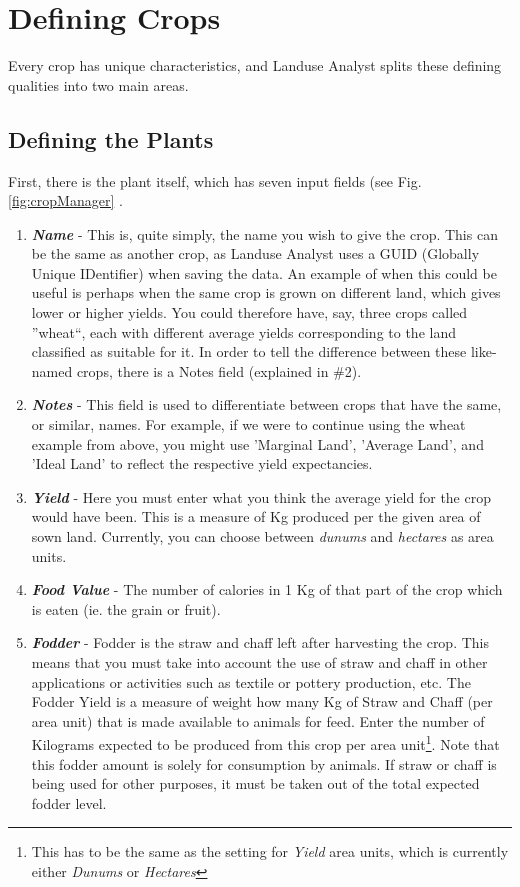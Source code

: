 \section{Defining Crops}Every crop has unique
characteristics, and Landuse Analyst splits these defining qualities into two
main areas.
  \subsection{Defining the Plants}First, there is
the plant itself, which has seven input fields (see Fig. \ref{fig:cropManager} .
    \begin{enumerate}
      \item \textbf{\textit{Name}} - This is, quite simply, the name you wish to
give the crop.  This can be the same as another crop, as Landuse Analyst uses a
GUID (Globally Unique IDentifier) when saving the data.  An example of when this
could be useful is perhaps when the same crop is grown on different land, which
gives lower or higher yields.  You could therefore have, say, three crops called
''wheat``, each with different average yields corresponding to the land
classified as suitable for it.  In order to tell the difference between these
like-named crops, there is a Notes field (explained in \#2).

      \item \textbf{\textit{Notes}} - This field is used to differentiate
between crops that have the same, or similar, names.  For example, if we were to
continue using the wheat example from above, you might use 'Marginal Land',
'Average Land', and 'Ideal Land' to reflect the respective yield expectancies.

      \item \textbf{\textit{Yield}} - Here you must enter what you think the
average yield for the crop would have been. This is a measure of Kg produced per
the given area of sown land.  Currently, you can choose between \textit{dunums}
and \textit{hectares} as area units.

      \item \textbf{\textit{Food Value}} - The number of calories in 1 Kg of
that part of the crop which is eaten (ie. the grain or fruit).

      \item \textbf{\textit{Fodder}} - Fodder is the straw and chaff left after
harvesting the crop.  This means that you must take into account the use of
straw and chaff in other applications or activities such as textile or pottery
production, etc.  The Fodder Yield is a measure of weight how many Kg of Straw
and Chaff (per area unit) that is made available to animals for feed.  Enter the
number of Kilograms expected to be produced from this crop per area
unit\footnote{This has to be the same as the setting for \textit{Yield} area
units, which is currently either \textit{Dunums} or \textit{Hectares}}.  Note
that this fodder amount is solely for consumption by animals.  If straw or chaff
is being used for other purposes, it must be taken out of the total expected
fodder level.


\end{enumerate}
